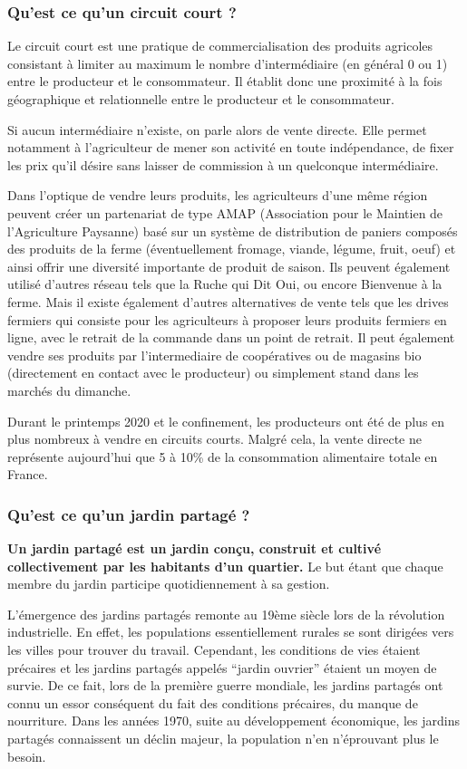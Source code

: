 \documentclass[french,a4paper]{article}
\begin{document}
\subsubsection{Qu’est ce qu’un circuit court ?}

Le circuit court est une pratique de commercialisation des produits agricoles consistant à limiter au maximum le nombre d’intermédiaire (en général 0 ou 1) entre le producteur et le consommateur. Il établit donc une proximité à la fois géographique et relationnelle entre le producteur et le consommateur.

Si aucun intermédiaire n’existe, on parle alors de vente directe. Elle permet notamment à l’agriculteur de mener son activité en toute indépendance, de fixer les prix qu’il désire sans laisser de commission à un quelconque intermédiaire.

Dans l’optique de vendre leurs produits, les agriculteurs d’une même région peuvent créer un partenariat de type AMAP (Association pour le Maintien de l'Agriculture Paysanne) basé sur un système de distribution de paniers  composés des produits de la ferme (éventuellement fromage, viande, légume, fruit, oeuf) et ainsi offrir une diversité importante de produit de saison. Ils peuvent également utilisé d’autres réseau tels que la Ruche qui Dit Oui, ou encore Bienvenue à la ferme. Mais il existe également d’autres alternatives de vente tels que les drives fermiers qui consiste pour les agriculteurs à proposer leurs produits fermiers en ligne, avec le retrait de la commande dans un point de retrait. Il peut également vendre ses produits par l’intermediaire de coopératives ou de magasins bio (directement en contact avec le producteur) ou simplement stand dans les marchés du dimanche.

Durant le printemps 2020 et le confinement, les producteurs ont été de plus en plus nombreux à vendre en circuits courts. Malgré cela, la vente directe ne représente aujourd’hui que 5 à 10\% de la consommation alimentaire totale en France.

\subsubsection{Qu’est ce qu’un jardin partagé ?}
\textbf{Un jardin partagé est un jardin conçu, construit et cultivé collectivement par les habitants d’un quartier.} Le but étant que chaque membre du jardin participe quotidiennement à sa gestion.

L’émergence des jardins partagés remonte au 19ème siècle lors de la révolution industrielle. En effet, les populations essentiellement rurales se sont dirigées vers les villes pour trouver du travail. Cependant, les conditions de vies étaient précaires et les jardins partagés appelés  “jardin ouvrier” étaient un moyen de survie. De ce fait, lors de la première guerre mondiale, les jardins partagés ont connu un essor conséquent du fait des conditions précaires, du manque de nourriture.  Dans les années 1970, suite au développement économique, les jardins partagés connaissent un déclin majeur, la population n’en n’éprouvant plus le besoin.
\end{document}
